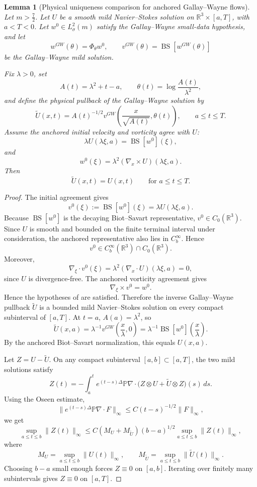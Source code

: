 \documentclass[11pt]{amsart}
\theoremstyle{plain}
\newtheorem{lemma}[lemma]{Lemma}
\theoremstyle{definition}
\theoremstyle{remark}
\numberwithin{equation}{section}
\begin{document}
\begin{lemma}[Physical uniqueness comparison for anchored Gallay--Wayne flows]
\label{p3:lem:anchored-gw-physical-comparison}
Let \(m>\frac72\).  Let \(U\) be a smooth mild Navier--Stokes solution on
\(\mathbb R^3\times[a,T]\), with \(a<T<0\).  Let \(w^0\in L^2_\sigma(m)\)
satisfy the Gallay--Wayne small-data hypothesis, and let
\[
   w^{GW}(\theta)=\Phi_\theta w^0,
   \qquad
   v^{GW}(\theta)=\operatorname{BS}[w^{GW}(\theta)]
\]
be the Gallay--Wayne mild solution.

Fix \(\lambda>0\), set
\[
   A(t)=\lambda^2+t-a,
   \qquad
   \theta(t)=\log\frac{A(t)}{\lambda^2},
\]
and define the physical pullback of the Gallay--Wayne solution by
\[
   \widetilde U(x,t)
   =
   A(t)^{-1/2}
   v^{GW}\!\left(\frac{x}{\sqrt{A(t)}},\theta(t)\right),
   \qquad a\le t\le T.
\]
Assume the anchored initial velocity and vorticity agree with \(U\):
\[
   \lambda U(\lambda\xi,a)=\operatorname{BS}[w^0](\xi),
\]
and
\[
   w^0(\xi)=\lambda^2(\nabla_x\times U)(\lambda\xi,a).
\]
Then
\[
   \widetilde U(x,t)=U(x,t)
   \qquad
   \text{for }a\le t\le T.
\]
\end{lemma}

\begin{proof}
The initial agreement gives
\[
   v^0(\xi):=\operatorname{BS}[w^0](\xi)=\lambda U(\lambda\xi,a).
\]
Because \(\operatorname{BS}[w^0]\) is the decaying Biot--Savart
representative, \(v^0\in C_0(\mathbb R^3)\).  Since \(U\) is smooth and
bounded on the finite terminal interval under consideration, the anchored
representative also lies in \(C_b^\infty\).  Hence
\[
   v^0\in C_b^\infty(\mathbb R^3)\cap C_0(\mathbb R^3).
\]
Moreover,
\[
   \nabla_\xi\cdot v^0(\xi)
   =
   \lambda^2(\nabla_x\cdot U)(\lambda\xi,a)
   =
   0,
\]
since \(U\) is divergence-free.
The anchored vorticity agreement gives
\[
   \nabla_\xi\times v^0=w^0.
\]
Hence the hypotheses of
 are satisfied.  Therefore the
inverse Gallay--Wayne pullback \(\widetilde U\) is a bounded mild
Navier--Stokes solution on every compact subinterval of \([a,T]\).  At
\(t=a\), \(A(a)=\lambda^2\), so
\[
   \widetilde U(x,a)
   =
   \lambda^{-1}
   v^{GW}\!\left(\frac{x}{\lambda},0\right)
   =
   \lambda^{-1}
   \operatorname{BS}[w^0]\!\left(\frac{x}{\lambda}\right).
\]
By the anchored Biot--Savart normalization, this equals \(U(x,a)\).

Let \(Z=U-\widetilde U\).  On any compact subinterval \([a,b]\subset[a,T]\),
the two mild solutions satisfy
\[
   Z(t)
   =
   -\int_a^t
   e^{(t-s)\Delta}\mathbb P\nabla\cdot
   \bigl(Z\otimes U+\widetilde U\otimes Z\bigr)(s)\,ds .
\]
Using the Oseen estimate,
\[
   \|e^{(t-s)\Delta}\mathbb P\nabla\cdot F\|_\infty
   \le C(t-s)^{-1/2}\|F\|_\infty,
\]
we get
\[
   \sup_{a\le t\le b}\|Z(t)\|_\infty
   \le
   C(M_U+M_{\widetilde U})(b-a)^{1/2}
   \sup_{a\le t\le b}\|Z(t)\|_\infty,
\]
where
\[
   M_U=\sup_{a\le t\le b}\|U(t)\|_\infty,
   \qquad
   M_{\widetilde U}=\sup_{a\le t\le b}\|\widetilde U(t)\|_\infty .
\]
Choosing \(b-a\) small enough forces \(Z\equiv0\) on \([a,b]\).  Iterating over
finitely many subintervals gives \(Z\equiv0\) on \([a,T]\).
\end{proof}
\end{document}
